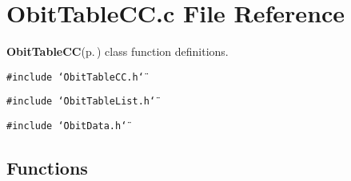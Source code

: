 \section{Obit\-Table\-CC.c File Reference}
\label{ObitTableCC_8c}
{\bf Obit\-Table\-CC}{\rm (p.\,\pageref{structObitTableCC})} class function definitions. 

{\tt \#include \char`\"{}Obit\-Table\-CC.h\char`\"{}}\par
{\tt \#include \char`\"{}Obit\-Table\-List.h\char`\"{}}\par
{\tt \#include \char`\"{}Obit\-Data.h\char`\"{}}\par
\subsection*{Functions}
